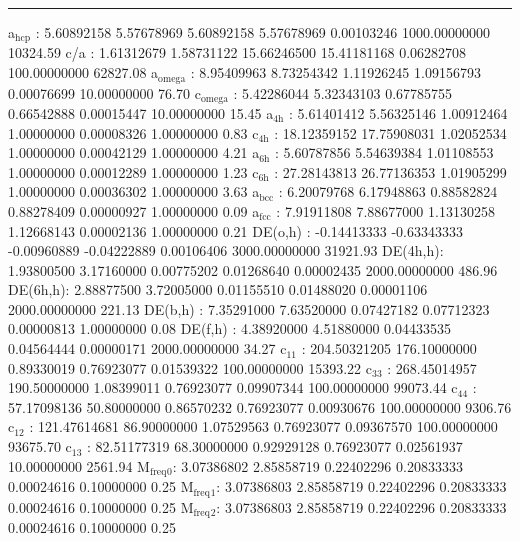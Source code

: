\documentclass[11pt]{article}
\begin{document}
\noindent\rule{\textwidth}{0.5pt}
a\(_{\text{hcp}}\)   :   5.60892158   5.57678969   5.60892158   5.57678969   0.00103246 1000.00000000     10324.59
c/a     :   1.61312679   1.58731122  15.66246500  15.41181168   0.06282708 100.00000000     62827.08
a\(_{\text{omega}}\) :   8.95409963   8.73254342   1.11926245   1.09156793   0.00076699  10.00000000        76.70
c\(_{\text{omega}}\) :   5.42286044   5.32343103   0.67785755   0.66542888   0.00015447  10.00000000        15.45
a\(_{\text{4h}}\)    :   5.61401412   5.56325146   1.00912464   1.00000000   0.00008326   1.00000000         0.83
c\(_{\text{4h}}\)    :  18.12359152  17.75908031   1.02052534   1.00000000   0.00042129   1.00000000         4.21
a\(_{\text{6h}}\)    :   5.60787856   5.54639384   1.01108553   1.00000000   0.00012289   1.00000000         1.23
c\(_{\text{6h}}\)    :  27.28143813  26.77136353   1.01905299   1.00000000   0.00036302   1.00000000         3.63
a\(_{\text{bcc}}\)   :   6.20079768   6.17948863   0.88582824   0.88278409   0.00000927   1.00000000         0.09
a\(_{\text{fcc}}\)   :   7.91911808   7.88677000   1.13130258   1.12668143   0.00002136   1.00000000         0.21
DE(o,h) :  -0.14413333  -0.63343333  -0.00960889  -0.04222889   0.00106406 3000.00000000     31921.93
DE(4h,h):   1.93800500   3.17160000   0.00775202   0.01268640   0.00002435 2000.00000000       486.96
DE(6h,h):   2.88877500   3.72005000   0.01155510   0.01488020   0.00001106 2000.00000000       221.13
DE(b,h) :   7.35291000   7.63520000   0.07427182   0.07712323   0.00000813   1.00000000         0.08
DE(f,h) :   4.38920000   4.51880000   0.04433535   0.04564444   0.00000171 2000.00000000        34.27
c\(_{\text{11}}\)    : 204.50321205 176.10000000   0.89330019   0.76923077   0.01539322 100.00000000     15393.22
c\(_{\text{33}}\)    : 268.45014957 190.50000000   1.08399011   0.76923077   0.09907344 100.00000000     99073.44
c\(_{\text{44}}\)    :  57.17098136  50.80000000   0.86570232   0.76923077   0.00930676 100.00000000      9306.76
c\(_{\text{12}}\)    : 121.47614681  86.90000000   1.07529563   0.76923077   0.09367570 100.00000000     93675.70
c\(_{\text{13}}\)    :  82.51177319  68.30000000   0.92929128   0.76923077   0.02561937  10.00000000      2561.94
M\(_{\text{freq}}\)\(_{\text{0}}\):   3.07386802   2.85858719   0.22402296   0.20833333   0.00024616   0.10000000         0.25
M\(_{\text{freq}}\)\(_{\text{1}}\):   3.07386803   2.85858719   0.22402296   0.20833333   0.00024616   0.10000000         0.25
M\(_{\text{freq}}\)\(_{\text{2}}\):   3.07386803   2.85858719   0.22402296   0.20833333   0.00024616   0.10000000         0.25
\end{document}
